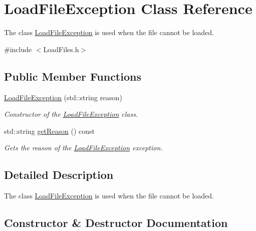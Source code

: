 \hypertarget{class_load_file_exception}{}\section{Load\+File\+Exception Class Reference}
\label{class_load_file_exception}


The class \hyperlink{class_load_file_exception}{Load\+File\+Exception} is used when the file cannot be loaded.  




{\ttfamily \#include $<$Load\+Files.\+h$>$}

\subsection*{Public Member Functions}
\begin{DoxyCompactItemize}
\item 
\hyperlink{class_load_file_exception_a7ad3c9710f570f149b6e4d743b8402ac}{Load\+File\+Exception} (std\+::string reason)
\begin{DoxyCompactList}\small\item\em Constructor of the \hyperlink{class_load_file_exception}{Load\+File\+Exception} class. \end{DoxyCompactList}\item 
std\+::string \hyperlink{class_load_file_exception_ad2bf5874a588870bff51b20dd9c9c425}{get\+Reason} () const 
\begin{DoxyCompactList}\small\item\em Gets the reason of the \hyperlink{class_load_file_exception}{Load\+File\+Exception} exception. \end{DoxyCompactList}\end{DoxyCompactItemize}


\subsection{Detailed Description}
The class \hyperlink{class_load_file_exception}{Load\+File\+Exception} is used when the file cannot be loaded. 

\subsection{Constructor \& Destructor Documentation}
